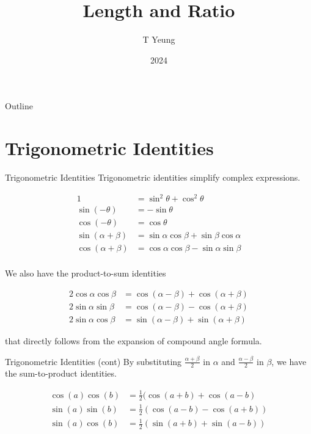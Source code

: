 \documentclass{beamer}
\title{Length and Ratio}
\author{T Yeung}
\institute{THMSS}
\date{2024}
\begin{document}
\setlength{\abovedisplayskip}{3pt}
\setlength{\belowdisplayskip}{3pt}

\frame{\titlepage}
\begin{frame}{Outline}
	\tableofcontents[pausesections]
\end{frame}

\section{Trigonometric Identities}
\begin{frame}{Trigonometric Identities}
	Trigonometric identities simplify complex expressions.
	\begin{block}{}
		\begin{equation*}
			\begin{split}
				1 &= \sin^2 \theta + \cos^2 \theta \\
				\sin(-\theta) &= - \sin \theta \\
				\cos(-\theta) &= \cos \theta \\
				\sin(\alpha + \beta) &= \sin \alpha \cos \beta + \sin \beta \cos \alpha \\ 
				\cos(\alpha + \beta) &= \cos \alpha \cos \beta - \sin \alpha \sin \beta \\
			\end{split}
		\end{equation*}
	\end{block}
	We also have the product-to-sum identities
	\begin{block}{}
		\begin{equation*}
			\begin{split}
				2\cos \alpha \cos \beta &= \cos(\alpha - \beta) + \cos(\alpha + \beta) \\
				2\sin \alpha \sin \beta &= \cos(\alpha - \beta) - \cos(\alpha + \beta) \\
				2\sin \alpha \cos \beta &= \sin(\alpha - \beta) + \sin(\alpha + \beta)
			\end{split}
		\end{equation*}	
	\end{block}
	that directly follows from the expansion of compound angle formula.
\end{frame}
\begin{frame}{Trigonometric Identities (cont)}
	By substituting $\frac{\alpha+\beta}{2}$ in $\alpha$ and $\frac{\alpha - \beta}{2}$ in $\beta$, we have the sum-to-product identities.
	\begin{block}{}
		\begin{equation*}
			\begin{split}
				\cos (a) \cos (b)&=\frac{1}{2}(\cos (a+b)+\cos (a-b) \\
				\sin (a) \sin (b)&=\frac{1}{2}(\cos (a-b)-\cos (a+b)) \\
				\sin (a) \cos (b)&=\frac{1}{2}(\sin (a+b)+\sin (a-b)) \\
			\end{split}
		\end{equation*}
	\end{block}
\end{frame}
\end{document}
